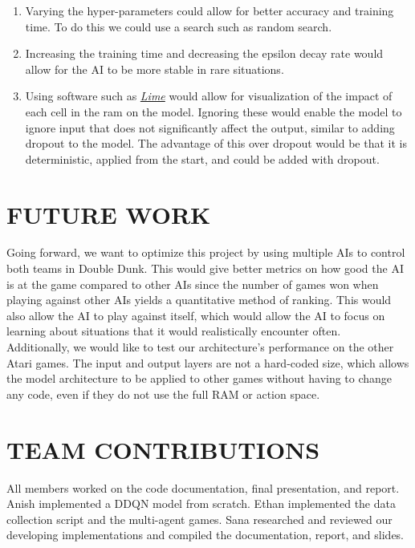 \documentclass[letterpaper, 10 pt, conference]{ieeeconf}
\begin{document}
\begin{enumerate}
    \item  Varying the hyper-parameters could allow for better accuracy and training time. To do this we could use a search such as random search. \\

    \item  Increasing the training time and decreasing the epsilon decay rate would allow for the AI to be more stable in rare situations. \\

    \item  Using software such as \href{https://github.com/marcotcr/lime/blob/master/README.md}{\textit{Lime}} would allow for visualization of the impact of each cell in the ram on the model. Ignoring these would enable the model to ignore input that does not significantly affect the output, similar to adding dropout to the model. The advantage of this over dropout would be that it is deterministic, applied from the start, and could be added with dropout. \\
\end{enumerate}

\section{\textbf{FUTURE WORK}}
\vspace{.5cm}
Going forward, we want to optimize this project by using multiple AIs to control both teams in Double Dunk. This would give better metrics on how good the AI is at the game compared to other AIs since the number of games won when playing against other AIs yields a quantitative method of ranking. This would also allow the AI to play against itself, which would allow the AI to focus on learning about situations that it would realistically encounter often. \\

Additionally, we would like to test our architecture's performance on the other Atari games. The input and output layers are not a hard-coded size, which allows the model architecture to be applied to other games without having to change any code, even if they do not use the full RAM or action space.\\

\section{\textbf{TEAM CONTRIBUTIONS}}
\vspace{.5cm}
 All members worked on the code documentation, final presentation, and report. Anish implemented a DDQN model from scratch. Ethan implemented the data collection script and the multi-agent games. Sana researched and reviewed our developing implementations and compiled the documentation, report, and slides. \\
\end{document}
